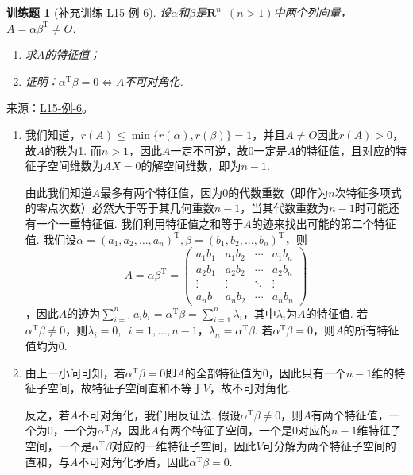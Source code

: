\documentclass[12pt,fontset=fandol]{ctexart}
\newtheorem{exercise}{训练题}[section]
\begin{document}
\begin{exercise}[补充训练 L15-例-6]\label{prob:L15-例-6}
设$\alpha$和$\beta$是$\mathbf{R}^n\enspace (n>1)$中两个列向量，$A=\alpha\beta^\mathrm{T}\neq O$.
    \begin{enumerate}
        \item 求$A$的特征值；

        \item 证明：$\alpha^\mathrm{T}\beta=0\iff A$不可对角化.
    \end{enumerate}
\end{exercise}
\noindent 来源：\href{https://github.com/yhwu-is/Linear-Algebra-Left-Undone/blob/new/%E8%AE%B2%E4%B9%89/%E4%B8%93%E9%A2%98/15%20%E7%9B%B8%E4%BC%BC%E6%A0%87%E5%87%86%E5%BD%A2%EF%BC%9A%E5%A4%8D%E6%95%B0%E5%9F%9F%E4%B8%8A%E7%9A%84%E5%B0%9D%E8%AF%95%E4%B8%8E%E7%90%86%E8%AE%BA.tex}{L15-例-6}。
\begin{solve}
\begin{enumerate}
        \item 我们知道，$r(A)\leqslant\min{\{r(\alpha),r(\beta)\}}=1$，并且$A\neq O$因此$r(A)>0$，故$A$的秩为1. 而$n>1$，因此$A$一定不可逆，故0一定是$A$的特征值，且对应的特征子空间维数为$AX=0$的解空间维数，即为$n-1$.

              由此我们知道$A$最多有两个特征值，因为0的代数重数（即作为$n$次特征多项式的零点次数）必然大于等于其几何重数$n-1$，当其代数重数为$n-1$时可能还有一个一重特征值. 我们利用特征值之和等于$A$的迹来找出可能的第二个特征值. 我们设$\alpha=(a_1,a_2,\ldots,a_n)^\mathrm{T},\beta=(b_1,b_2,\ldots,b_n)^\mathrm{T}$，则
\[A=\alpha\beta^\mathrm{T}=\begin{pmatrix}
                      a_1b_1 & a_1b_2 & \cdots & a_1b_n \\
                      a_2b_1 & a_2b_2 & \cdots & a_2b_n \\
                      \vdots & \vdots & \ddots & \vdots \\
                      a_nb_1 & a_nb_2 & \cdots & a_nb_n
                  \end{pmatrix}\]
，因此$A$的迹为$\sum\limits_{i=1}^na_ib_i=\alpha^\mathrm{T}\beta=\sum\limits_{i=1}^n\lambda_i$，其中$\lambda_i$为$A$的特征值. 若$\alpha^\mathrm{T}\beta\neq 0$，则$\lambda_i=0,\enspace i=1,\ldots,n-1$，$\lambda_n=\alpha^\mathrm{T}\beta$. 若$\alpha^\mathrm{T}\beta=0$，则$A$的所有特征值均为0.

        \item 由上一小问可知，若$\alpha^\mathrm{T}\beta=0$即$A$的全部特征值为0，因此只有一个$n-1$维的特征子空间，故特征子空间直和不等于$V$，故不可对角化.

              反之，若$A$不可对角化，我们用反证法. 假设$\alpha^\mathrm{T}\beta\neq 0$，则$A$有两个特征值，一个为0，一个为$\alpha^\mathrm{T}\beta$，因此$A$有两个特征子空间，一个是0对应的$n-1$维特征子空间，一个是$\alpha^\mathrm{T}\beta$对应的一维特征子空间，因此$V$可分解为两个特征子空间的直和，与$A$不可对角化矛盾，因此$\alpha^\mathrm{T}\beta=0$.
    \end{enumerate}
\end{solve}
\end{document}
